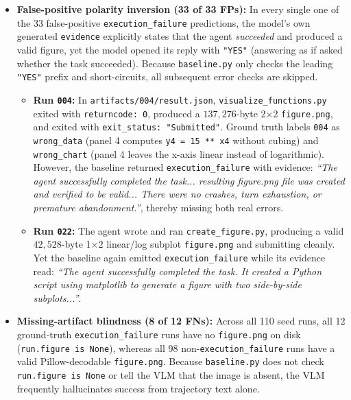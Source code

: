 \documentclass[11pt]{article}
\begin{document}
\begin{itemize}
    \item \textbf{False-positive polarity inversion (33 of 33 FPs):} In every single one of the 33 false-positive \texttt{execution\_failure} predictions, the model's own generated \texttt{evidence} explicitly states that the agent \emph{succeeded} and produced a valid figure, yet the model opened its reply with \texttt{"YES"} (answering as if asked whether the task succeeded). Because \texttt{baseline.py} only checks the leading \texttt{"YES"} prefix and short-circuits, all subsequent error checks are skipped.
    \begin{itemize}
        \item \textbf{Run \texttt{004}:} In \texttt{artifacts/004/result.json}, \texttt{visualize\_functions.py} exited with \texttt{returncode: 0}, produced a $137{,}276$-byte 2$\times$2 \texttt{figure.png}, and exited with \texttt{exit\_status: "Submitted"}. Ground truth labels \texttt{004} as \texttt{wrong\_data} (panel 4 computes \texttt{y4 = 15 ** x4} without cubing) and \texttt{wrong\_chart} (panel 4 leaves the x-axis linear instead of logarithmic). However, the baseline returned \texttt{execution\_failure} with evidence: \textit{``The agent successfully completed the task... resulting figure.png file was created and verified to be valid... There were no crashes, turn exhaustion, or premature abandonment.''}, thereby missing both real errors.
        \item \textbf{Run \texttt{022}:} The agent wrote and ran \texttt{create\_figure.py}, producing a valid $42{,}528$-byte 1$\times$2 linear/log subplot \texttt{figure.png} and submitting cleanly. Yet the baseline again emitted \texttt{execution\_failure} while its evidence read: \textit{``The agent successfully completed the task. It created a Python script using matplotlib to generate a figure with two side-by-side subplots...''}.
    \end{itemize}
    \item \textbf{Missing-artifact blindness (8 of 12 FNs):} Across all 110 seed runs, all 12 ground-truth \texttt{execution\_failure} runs have no \texttt{figure.png} on disk (\texttt{run.figure is None}), whereas all 98 non-\texttt{execution\_failure} runs have a valid Pillow-decodable \texttt{figure.png}. Because \texttt{baseline.py} does not check \texttt{run.figure is None} or tell the VLM that the image is absent, the VLM frequently hallucinates success from trajectory text alone.
    \begin{itemize}

\end{itemize}
\end{itemize}
\end{document}
